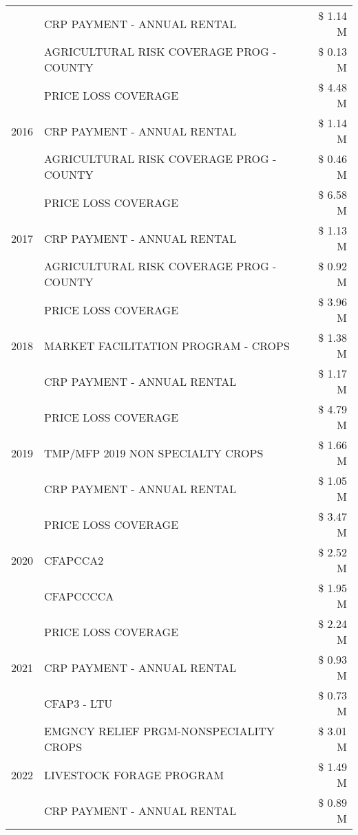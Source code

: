\begin{tabular}{llr}
 & CRP PAYMENT - ANNUAL RENTAL & \$ 1.14 M \\
 & AGRICULTURAL RISK COVERAGE PROG - COUNTY & \$ 0.13 M \\
\cline{1-3}
\multirow[t]{3}{*}{2016} & PRICE LOSS COVERAGE & \$ 4.48 M \\
 & CRP PAYMENT - ANNUAL RENTAL & \$ 1.14 M \\
 & AGRICULTURAL RISK COVERAGE PROG - COUNTY & \$ 0.46 M \\
\cline{1-3}
\multirow[t]{3}{*}{2017} & PRICE LOSS COVERAGE & \$ 6.58 M \\
 & CRP PAYMENT - ANNUAL RENTAL & \$ 1.13 M \\
 & AGRICULTURAL RISK COVERAGE PROG - COUNTY & \$ 0.92 M \\
\cline{1-3}
\multirow[t]{3}{*}{2018} & PRICE LOSS COVERAGE & \$ 3.96 M \\
 & MARKET FACILITATION PROGRAM - CROPS & \$ 1.38 M \\
 & CRP PAYMENT - ANNUAL RENTAL & \$ 1.17 M \\
\cline{1-3}
\multirow[t]{3}{*}{2019} & PRICE LOSS COVERAGE & \$ 4.79 M \\
 & TMP/MFP 2019 NON SPECIALTY CROPS & \$ 1.66 M \\
 & CRP PAYMENT - ANNUAL RENTAL & \$ 1.05 M \\
\cline{1-3}
\multirow[t]{3}{*}{2020} & PRICE LOSS COVERAGE & \$ 3.47 M \\
 & CFAPCCA2 & \$ 2.52 M \\
 & CFAPCCCCA & \$ 1.95 M \\
\cline{1-3}
\multirow[t]{3}{*}{2021} & PRICE LOSS COVERAGE & \$ 2.24 M \\
 & CRP PAYMENT - ANNUAL RENTAL & \$ 0.93 M \\
 & CFAP3 - LTU & \$ 0.73 M \\
\cline{1-3}
\multirow[t]{3}{*}{2022} & EMGNCY RELIEF PRGM-NONSPECIALITY CROPS & \$ 3.01 M \\
 & LIVESTOCK FORAGE PROGRAM & \$ 1.49 M \\
 & CRP PAYMENT - ANNUAL RENTAL & \$ 0.89 M \\
\cline{1-3}
\bottomrule
\end{tabular}
